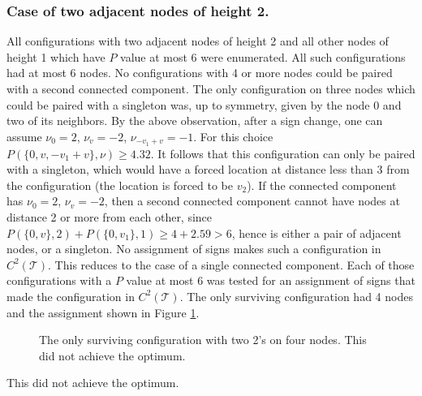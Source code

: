 \documentclass[a4paper, 12pt, notitlepage]{amsart}
\newcommand{\sT}{\mathscr{T}}
\theoremstyle{remark}
\begin{document}
\subsubsection*{ Case of two adjacent nodes of height 2.}  
  All configurations with two adjacent nodes of height 2 and all other nodes of height 1 which have $P$ value at most $6$ were enumerated.  All such configurations had at most 6 nodes.  No configurations with 4 or more nodes could be paired with a second connected component.  The only configuration on three nodes which could be paired with a singleton was, up to symmetry, given by the node 0 and two of its neighbors. By the above observation, after a sign change, one can assume $\nu_0 = 2$, $\nu_v = -2$, $\nu_{-v_1 + v} = -1$.  For this choice $P(\{0, v, -v_1+v\}, \nu) \geq 4.32$.  It follows that this configuration can only be paired with a singleton, which would have a forced location at distance less than 3 from the configuration (the location is forced to be $v_2$).  If the connected component has $\nu_0 = 2$, $\nu_v = -2$, then a second connected component cannot have nodes at distance 2 or more from each other, since $P(\{0, v\}, 2) + P(\{0, v_1\},1)\geq 4 + 2.59 > 6$, hence is either a pair of adjacent nodes, or a singleton.  No assignment of signs makes such a configuration in $C^2(\sT)$.  This reduces to the case of a single connected component.  Each of those configurations with a $P$ value at most 6 was tested for an assignment of signs that made the configuration in $C^2(\sT)$.  The only surviving configuration had 4 nodes and  the assignment shown in Figure \ref{fig:2_twos}.
 \begin{figure}
 \caption{The only surviving configuration with two 2's on four nodes.  This did not achieve the optimum.}
 \label{fig:2_twos}
 \end{figure}
 This did not achieve the optimum.

\end{document}

